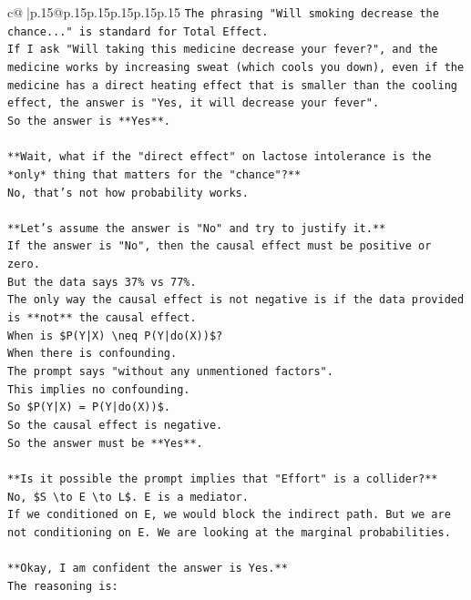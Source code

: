 \documentclass{article}
\begin{document}
{\begin{supertabular}{c@{$\;$}|p{.15\linewidth}@{}p{.15\linewidth}p{.15\linewidth}p{.15\linewidth}p{.15\linewidth}p{.15\linewidth}}
{{{\texttt{The phrasing "Will smoking decrease the chance..." is standard for Total Effect.} \\
\texttt{If I ask "Will taking this medicine decrease your fever?", and the medicine works by increasing sweat (which cools you down), even if the medicine has a direct heating effect that is smaller than the cooling effect, the answer is "Yes, it will decrease your fever".} \\
\texttt{So the answer is **Yes**.} \\
\\ 
\texttt{**Wait, what if the "direct effect" on lactose intolerance is the *only* thing that matters for the "chance"?**} \\
\texttt{No, that's not how probability works.} \\
\\ 
\texttt{**Let's assume the answer is "No" and try to justify it.**} \\
\texttt{If the answer is "No", then the causal effect must be positive or zero.} \\
\texttt{But the data says 37\% vs 77\%.} \\
\texttt{The only way the causal effect is not negative is if the data provided is **not** the causal effect.} \\
\texttt{When is \$P(Y|X) \textbackslash{}neq P(Y|do(X))\$?} \\
\texttt{When there is confounding.} \\
\texttt{The prompt says "without any unmentioned factors".} \\
\texttt{This implies no confounding.} \\
\texttt{So \$P(Y|X) = P(Y|do(X))\$.} \\
\texttt{So the causal effect is negative.} \\
\texttt{So the answer must be **Yes**.} \\
\\ 
\texttt{**Is it possible the prompt implies that "Effort" is a collider?**} \\
\texttt{No, \$S \textbackslash{}to E \textbackslash{}to L\$. E is a mediator.} \\
\texttt{If we conditioned on E, we would block the indirect path. But we are not conditioning on E. We are looking at the marginal probabilities.} \\
\\ 
\texttt{**Okay, I am confident the answer is Yes.**} \\
\texttt{The reasoning is:} \\
}}}
\end{supertabular}}
\end{document}
